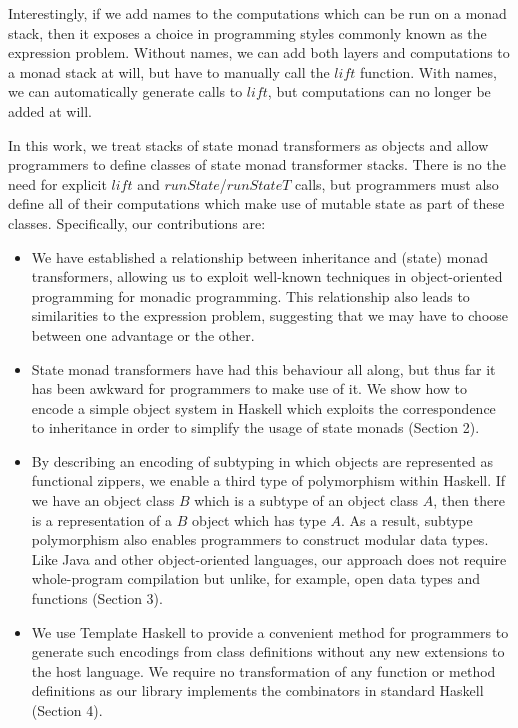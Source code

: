 Interestingly, if we add names to the computations which can be run on a monad stack, then it exposes a choice in programming styles commonly known as the expression problem\cite{wadler1998expression}. Without names, we can add both layers and computations to a monad stack at will, but have to manually call the $\mathit{lift}$ function. With names, we can automatically generate calls to $\mathit{lift}$, but computations can no longer be added at will.

In this work, we treat stacks of state monad transformers as objects and allow programmers to define classes of state monad transformer stacks. There is no the need for explicit $\mathit{lift}$ and $\mathit{runState}$/$\mathit{runStateT}$ calls, but programmers must also define all of their computations which make use of mutable state as part of these classes. Specifically, our contributions are:
\begin{itemize}
    \item We have established a relationship between inheritance and (state) monad transformers, allowing us to exploit well-known techniques in object-oriented programming for monadic programming. This relationship also leads to similarities to the expression problem, suggesting that we may have to choose between one advantage or the other.
    \item State monad transformers have had this behaviour all along, but thus far it has been awkward for programmers to make use of it. We show how to encode a simple object system in Haskell which exploits the correspondence to inheritance in order to simplify the usage of state monads (Section 2).
    \item By describing an encoding of subtyping in which objects are represented as functional zippers, we enable a third type of polymorphism within Haskell. If we have an object class $B$ which is a subtype of an object class $A$, then there is a representation of a $B$ object which has type $A$. As a result, subtype polymorphism also enables programmers to construct modular data types. Like Java and other object-oriented languages, our approach does not require whole-program compilation but unlike, for example, open data types and functions\cite{loh2006open} (Section 3).
    \item We use Template Haskell to provide a convenient method for programmers to generate such encodings from class definitions without any new extensions to the host language. We require no transformation of any function or method definitions as our library implements the combinators in standard Haskell (Section 4).
\end{itemize}

\pagebreak